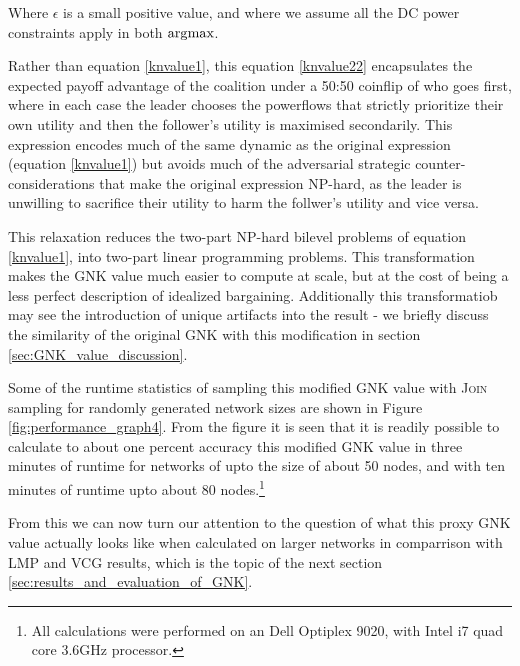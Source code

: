 Where $\epsilon$ is a small positive value, and where we assume all the DC power constraints apply in both $\operatorname*{\arg\!\max}$.

Rather than equation \eqref{knvalue1}, this equation \eqref{knvalue22} encapsulates the expected payoff advantage of the coalition under a 50:50 coinflip of who goes first, where in each case the leader chooses the powerflows that strictly prioritize their own utility and then the follower's utility is maximised secondarily.
This expression encodes much of the same dynamic as the original expression (equation \ref{knvalue1}) but avoids much of the adversarial strategic counter-considerations that make the original expression NP-hard, as the leader is unwilling to sacrifice their utility to harm the follwer's utility and vice versa.

This relaxation reduces the two-part NP-hard bilevel problems of equation \ref{knvalue1}, into two-part linear programming problems.
This transformation makes the GNK value much easier to compute at scale, but at the cost of being a less perfect description of idealized bargaining.
Additionally this transformatiob may see the introduction of unique artifacts into the result - we briefly discuss the similarity of the original GNK with this modification in section \ref{sec:GNK_value_discussion}.

Some of the runtime statistics of sampling this modified GNK value with \textsc{Join} sampling for randomly generated network sizes are shown in Figure \ref{fig:performance_graph4}.
From the figure it is seen that it is readily possible to calculate to about one percent accuracy this modified GNK value in three minutes of runtime for networks of upto the size of about 50 nodes, and with ten minutes of runtime upto about 80 nodes.\footnote{\label{note1} All calculations were performed on an Dell Optiplex 9020, with Intel i7 quad core 3.6GHz processor.}%

From this we can now turn our attention to the question of what this proxy GNK value actually looks like when calculated on larger networks in comparrison with LMP and VCG results, which is the topic of the next section \ref{sec:results_and_evaluation_of_GNK}.





